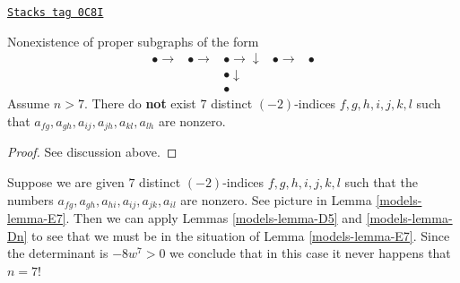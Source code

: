 \begin{lemma}[E6 completed]
\label{models-lemma-E6-completed}
\href{https://stacks.math.columbia.edu/tag/0C8I}{\texttt{Stacks tag 0C8I}}

Nonexistence of proper subgraphs of the form
$$
\begin{array}{ccccc}\bullet \longrightarrow & \bullet \longrightarrow & \bullet \longrightarrow\downarrow & \bullet \longrightarrow & \bullet \\  &  & \bullet \downarrow &  &  \\  &  & \bullet &  & \end{array}
$$
Assume $n > 7$. There do {\bf not} exist $7$ distinct
$(-2)$-indices $f, g, h, i, j, k, l$
such that $a_{fg}, a_{gh}, a_{ij}, a_{jh}, a_{kl}, a_{lh}$ are nonzero.
\end{lemma}

\begin{proof}
See discussion above.
\end{proof}

Suppose we are given $7$ distinct $(-2)$-indices $f, g, h, i, j, k, l$
such that the numbers
$a_{fg}, a_{gh}, a_{hi}, a_{ij}, a_{jk}, a_{il}$ are nonzero.
See picture in Lemma \ref{models-lemma-E7}. Then we can apply
Lemmas \ref{models-lemma-D5} and \ref{models-lemma-Dn}
to see that we must be in the situation
of Lemma \ref{models-lemma-E7}. Since the determinant is $-8w^7 > 0$
we conclude that in this case it never happens that $n = 7$!

